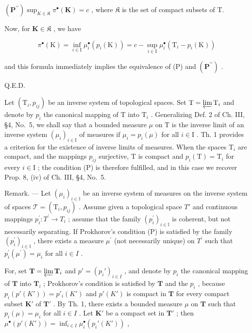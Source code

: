 \((\mathbf{P}^{\prime \prime})\sup_{K\in \mathfrak{K}}\pi^{\bullet}(\mathbf{K}) = c\) , where \(\mathfrak{K}\) is the set of compact subsets of T.

Now, for \(\mathbf{K} \in \mathfrak{K}\) , we have

\[
\pi^ {\bullet} (\mathrm{K}) = \inf _ {i \in \mathrm{I}} \mu_ {i} ^ {\bullet} (p _ {i} (\mathrm{K})) = c - \sup _ {i \in \mathrm{I}} \mu_ {i} ^ {\bullet} (\mathrm{T} _ {i} - p _ {i} (\mathrm{K}))
\]

and this formula immediately implies the equivalence of (P) and \((\mathbf{P}^{\prime \prime})\) .

Q.E.D.

Let \((\mathrm{T}_{i}, p_{ij})\) be an inverse system of topological spaces. Set \(\mathrm{T} = \varprojlim \mathrm{T}_{i}\) and denote by \(p_{i}\) the canonical mapping of \(\mathrm{T}\) into \(\mathrm{T}_{i}\) . Generalizing Def. 2 of Ch. III, §4, No.~5, we shall say that a bounded measure \(\mu\) on \(\mathrm{T}\) is the inverse limit of an inverse system \((\mu_{i})_{i \in \mathrm{I}}\) of measures if \(\mu_{i} = p_{i}(\mu)\) for all \(i \in \mathrm{I}\) . Th. 1 provides a criterion for the existence of inverse limits of measures. When the spaces \(\mathrm{T}_{i}\) are compact, and the mappings \(p_{ij}\) surjective, \(\mathrm{T}\) is compact and \(p_{i}(\mathrm{T}) = \mathrm{T}_{i}\) for every \(i \in \mathrm{I}\) ; the condition (P) is therefore fulfilled, and in this case we recover Prop. 8, (iv) of Ch. III, §4, No.~5.

Remark. --- Let \((\mu_{i})_{i\in\mathbb{I}}\) be an inverse system of measures on the inverse system of spaces \(\mathcal{T}=(\mathrm{T}_{i},p_{ij})\) . Assume given a topological space \(T'\) and continuous mappings \(p_{i}^{\prime}:T^{\prime}\to T_{i}\) ; assume that the family \((p_{i}^{\prime})_{i\in\mathbb{I}}\) is coherent, but not necessarily separating. If Prokhorov's condition (P) is satisfied by the family \((p_{i}^{\prime})_{i\in\mathbb{I}}\) , there exists a measure \(\mu^{\prime}\) (not necessarily unique) on \(T^{\prime}\) such that \(p_{i}^{\prime}(\mu^{\prime})=\mu_{i}\) for all \(i\in I\) .

For, set \(\mathbf{T} = \varprojlim \mathbf{T}_i\) and \(p' = (p_i')_{i\in I}\) , and denote by \(p_i\) the canonical mapping of \(\mathbf{T}\) into \(\mathbf{T}_i\) ; Prokhorov's condition is satisfied by \(\mathbf{T}\) and the \(p_i\) , because \(p_i(p'(K')) = p'_i(K')\) and \(p'(K')\) is compact in \(\mathbf{T}\) for every compact subset \(\mathbf{K}'\) of \(\mathbf{T}'\) . By Th. 1, there exists a bounded measure \(\mu\) on \(\mathbf{T}\) such that \(p_i(\mu) = \mu_i\) for all \(i\in I\) . Let \(\mathbf{K}'\) be a compact set in \(\mathbf{T}'\) ; then \(\mu^\bullet (p'(K')) = \inf_{i\in I}\mu_i^\bullet (p_i'(K'))\) ,

